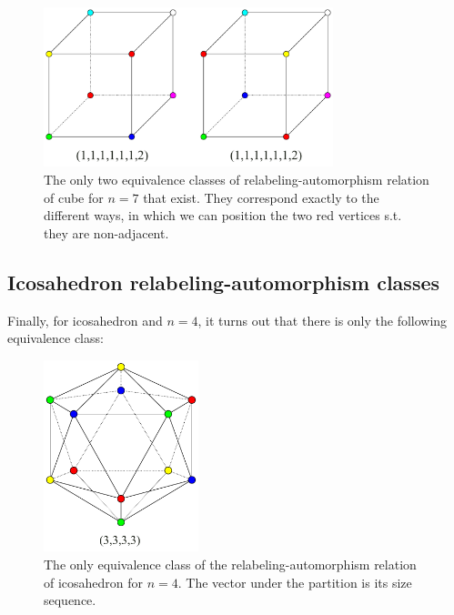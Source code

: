 \begin{figure}[H]
    \centering
    \includegraphics[width=0.75\textwidth]{Resources/Figs/cube_non_relaut-7-clrings.pdf}
    \caption{The only two equivalence classes of relabeling-automorphism relation of cube for $n=7$ that exist. They correspond exactly to the different ways, in which we can position the two red vertices s.t. they are non-adjacent.}
    \label{fig:cube-7clring-relaut-classes}
\end{figure}

\subsection{Icosahedron relabeling-automorphism classes}

Finally, for icosahedron and $n=4$, it turns out that there is only the following equivalence class:

\begin{figure}[H]
    \centering
    \includegraphics[width=0.4\textwidth]{Resources/Figs/icosahedron_non_relaut-4-clrings.pdf}
    \caption{The only equivalence class of the relabeling-automorphism relation of icosahedron for $n=4$. The vector under the partition is its size sequence.}
    \label{fig:icosahedron-4clring-relaut-classes}
\end{figure}

